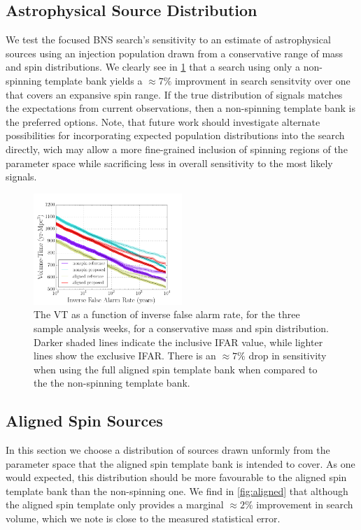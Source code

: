 \subsection{Astrophysical Source Distribution}

We test the focused BNS search's sensitivity to an estimate of astrophysical sources using an injection population drawn from a conservative range of mass and spin distributions. We clearly see in \ref{fig:rest} that a search using only a non-spinning template bank yields a $\approx{7\%}$ improvment in search sensitvity over one that covers an expansive spin range. If the true distribution of signals matches the expectations from current observations, then a non-spinning template bank is the preferred options. Note, that future work should investigate alternate possibilities for incorporating expected population distributions into the search directly, wich may allow a more fine-grained inclusion of spinning regions of the parameter space while sacrificing less in overall sensitivity to the most likely signals.

\begin{figure}
\centering
\includegraphics[width=0.5\textwidth]{papers/bns_o1_dev/figures/rest_combined.png}
\caption{\label{fig:rest} 
The VT as a function of inverse false alarm rate, for the
three sample analysis weeks, for a conservative mass and spin distribution. Darker shaded lines indicate the inclusive IFAR value, while lighter lines show the exclusive IFAR. There is an $\approx 7\%$ drop in sensitivity when using the full aligned spin template bank when compared to the the non-spinning
template bank.}
\end{figure}

\subsection{Aligned Spin Sources}

In this section we choose a distribution of sources drawn unformly from the parameter space that the aligned spin template bank is intended to cover. As one would expected, this distribution should be more favourable to the aligned spin template bank than the non-spinning one. We find in \ref{fig:aligned} that although the aligned spin template only provides a marginal $\approx 2\%$ improvement in search volume, which we note is close to the measured statistical error. 

